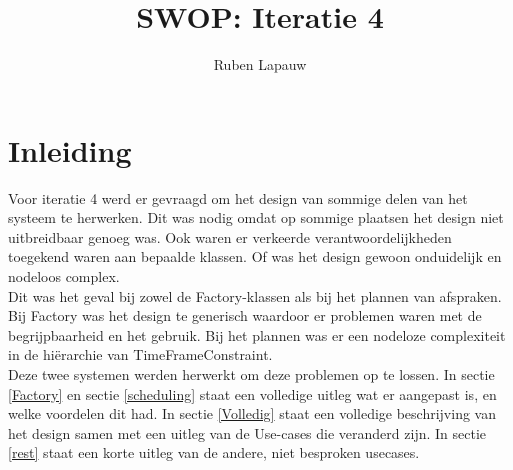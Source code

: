 \documentclass[a4paper,10pt]{article}
\title{SWOP: Iteratie 4}
\author{Ruben Lapauw}
\date{}
\begin{document}
\maketitle
\newpage
\section{Inleiding}
Voor iteratie 4 werd er gevraagd om het design van sommige delen van het systeem te herwerken. 
Dit was nodig omdat op sommige plaatsen het design niet uitbreidbaar genoeg was. 
Ook waren er verkeerde verantwoordelijkheden toegekend waren aan bepaalde klassen. 
Of was het design gewoon onduidelijk en nodeloos complex. \\

Dit was het geval bij zowel de Factory-klassen als bij het plannen van afspraken. 
Bij Factory was het design te generisch waardoor er problemen waren met de begrijpbaarheid en het gebruik.
Bij het plannen was er een nodeloze complexiteit in de hiërarchie van TimeFrameConstraint.\\

Deze twee systemen werden herwerkt om deze problemen op te lossen. 
In sectie \ref{Factory} en sectie \ref{scheduling} staat een volledige uitleg wat er aangepast is, en welke voordelen dit had.
In sectie \ref{Volledig} staat een volledige beschrijving van het design samen met een uitleg van de Use-cases die veranderd zijn.
In sectie \ref{rest} staat een korte uitleg van de andere, niet besproken usecases.


\end{document}
